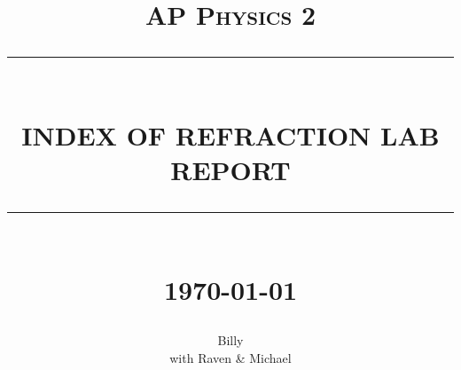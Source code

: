 \documentclass[12pt]{report}
\newcommand{\HRule}[1]{\rule{\linewidth}{#1}}
\begin{document}
\title{ \normalsize \textsc{AP Physics 2}
		\\ [2.0cm]
		\HRule{0.5pt} \\
		\LARGE \textbf{\uppercase{Index of Refraction Lab Report}}
		\HRule{2pt} \\ [0.5cm]
		\normalsize \today \vspace*{5\baselineskip}}

\date{}

\author{
		Billy \\ 
		with Raven \& Michael}

\maketitle
\sectionfont{\scshape}

\end{document}
